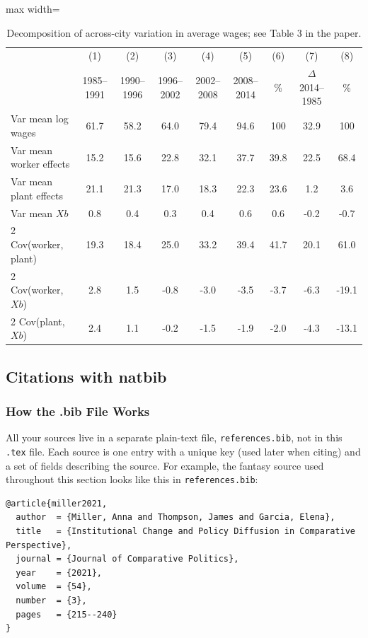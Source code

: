 \begin{table}[t]
\centering
\begin{adjustbox}{max width=\textwidth}
\begin{tabular}{lcccccccc}
\toprule
 & (1) & (2) & (3) & (4) & (5) & (6) & (7) & (8) \\
 & 1985--1991 & 1990--1996 & 1996--2002 & 2002--2008 & 2008--2014 & \% & $\Delta$ 2014--1985 & \% \\
\midrule
Var mean log wages      & 61.7 & 58.2 & 64.0 & 79.4 & 94.6 & 100 & 32.9 & 100 \\
Var mean worker effects & 15.2 & 15.6 & 22.8 & 32.1 & 37.7 & 39.8 & 22.5 & 68.4 \\
Var mean plant effects  & 21.1 & 21.3 & 17.0 & 18.3 & 22.3 & 23.6 &  1.2 &  3.6 \\
Var mean $Xb$           &  0.8 &  0.4 &  0.3 &  0.4 &  0.6 &  0.6 & -0.2 & -0.7 \\
2 Cov(worker, plant)    & 19.3 & 18.4 & 25.0 & 33.2 & 39.4 & 41.7 & 20.1 & 61.0 \\
2 Cov(worker, $Xb$)     &  2.8 &  1.5 & -0.8 & -3.0 & -3.5 & -3.7 & -6.3 & -19.1 \\
2 Cov(plant, $Xb$)      &  2.4 &  1.1 & -0.2 & -1.5 & -1.9 & -2.0 & -4.3 & -13.1 \\
\bottomrule
\end{tabular}
\end{adjustbox}
\caption{Decomposition of across-city variation in average wages; see Table 3 in the paper.}
\label{tab:varDecomp}
\end{table}

\subsection*{Citations with natbib}

\subsubsection*{How the .bib File Works}
All your sources live in a separate plain-text file, \texttt{references.bib}, not in this \texttt{.tex} file. Each source is one entry with a unique key (used later when citing) and a set of fields describing the source. For example, the fantasy source used throughout this section looks like this in \texttt{references.bib}:

{\footnotesize
\begin{verbatim}
@article{miller2021,
  author  = {Miller, Anna and Thompson, James and Garcia, Elena},
  title   = {Institutional Change and Policy Diffusion in Comparative Perspective},
  journal = {Journal of Comparative Politics},
  year    = {2021},
  volume  = {54},
  number  = {3},
  pages   = {215--240}
}
\end{verbatim}
}

